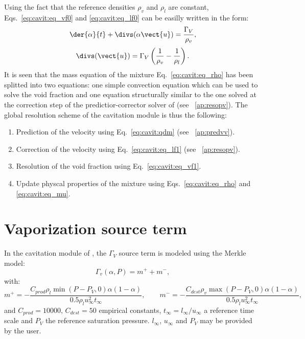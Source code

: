 Using the fact that the reference densities $\rho_v$ and $\rho_l$ are
constant, Eqs.~\eqref{eq:cavit:eq_vf0} and \eqref{eq:cavit:eq_lf0} can be easilly
written in the form:
\begin{equation}
\label{eq:cavit:eq_vf1}
\der{\alpha}{t} + \divs(\alpha\vect{u}) =
\dfrac{\Gamma_V}{\rho_v},
\end{equation}
%
\begin{equation}
\label{eq:cavit:eq_lf1}
\divs(\vect{u})=\Gamma_V\left(\frac{1}{\rho_v}-\frac{1}{\rho_l}\right).
\end{equation}
It is seen that the mass equation of the mixture Eq.~\eqref{eq:cavit:eq_rho}
has been splitted into two equations: one simple convection equation
which can be used to solve the void fraction and one equation
structurally similar to the one solved at the correction step of the
predictior-corrector solver of \CS (see \appendixname~\ref{ap:resopv}).
The global resolution scheme of the cavitation module is thus the
following:
\begin{enumerate}
\item Prediction of the velocity using Eq.~\eqref{eq:cavit:qdm} (see
\appendixname~\ref{ap:predvv}).
\item Correction of the velocity using Eq.~\eqref{eq:cavit:eq_lf1} (see
\appendixname~\ref{ap:resopv}).
\item Resolution of the void fraction using Eq.~\eqref{eq:cavit:eq_vf1}.
\item Update physcal properties of the mixture using
Eqs.~\eqref{eq:cavit:eq_rho} and \eqref{eq:cavit:eq_mu}.
\end{enumerate}
%
\section{Vaporization source term}
\label{sec:cavit:source_term}
In the cavitation module of \CS, the $\Gamma_V$ source term is
modeled using the Merkle model:
\begin{equation*}
\Gamma_v \left(\alpha, P\right) = m^+ + m^-,
\end{equation*}
 with:
\begin{equation}
m^+ = -\dfrac{C_{prod} \rho_l \min \left( P-P_V,0
\right)\alpha(1-\alpha)}{0.5\rho_lu_\infty^2t_\infty},\qquad
m^- = -\dfrac{C_{dest} \rho_v \max \left( P-P_V,0
\right)\alpha(1-\alpha)}{0.5\rho_lu_\infty^2t_\infty},
\end{equation}
and
$ C_{prod} = 10000, \, C_{dest} = 50 $
empirical constants, $t_\infty=l_\infty/u_\infty$ a reference time
scale and $P_V$ the reference saturation pressure. $l_\infty$,
$u_\infty$ and $P_V$ may be provided by the user.
%
